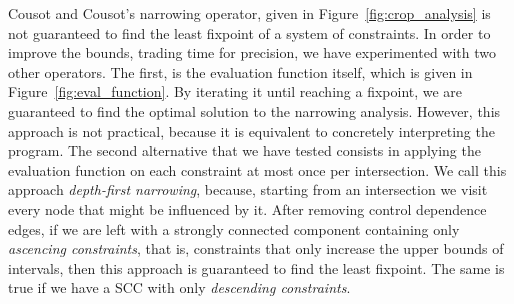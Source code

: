 \documentclass[preprint]{sigplanconf}
\begin{document}
Cousot and Cousot's narrowing operator, given in
Figure~\ref{fig:crop_analysis} is not guaranteed to find the least fixpoint
of a system of constraints.
In order to improve the bounds, trading time for precision, we have
experimented with two other operators.
The first, is the evaluation function itself, which is given in
Figure~\ref{fig:eval_function}.
By iterating it until reaching a fixpoint, we are guaranteed to find the
optimal solution to the narrowing analysis.
However, this approach is not practical, because it is equivalent to
concretely interpreting the program.
The second alternative that we have tested consists in applying the
evaluation function on each constraint at most once per intersection.
We call this approach {\em depth-first narrowing}, because, starting from
an intersection we visit every node that might be influenced by it.
After removing control dependence edges, if we are left with a strongly
connected component containing only {\em ascencing constraints}, that
is, constraints that only increase the upper bounds of intervals, then this
approach is guaranteed to find the least fixpoint.
The same is true if we have a SCC with only {\em descending constraints}.



\end{document}
